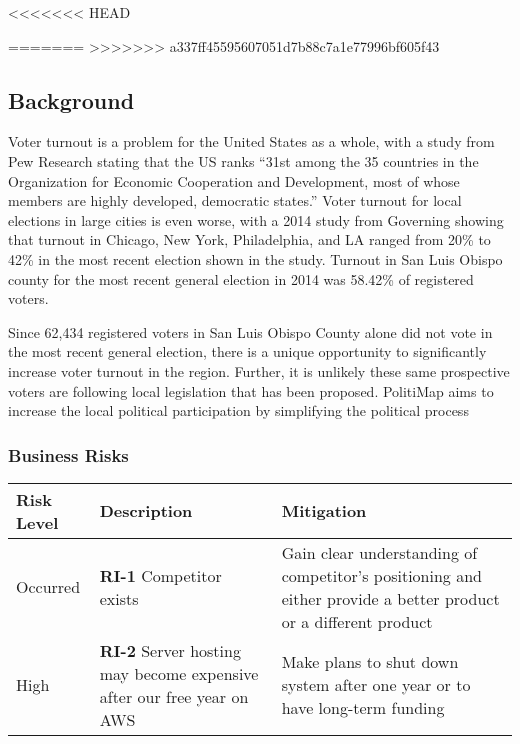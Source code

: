 % 
<<<<<<< HEAD

=======
>>>>>>> a337ff45595607051d7b88c7a1e77996bf605f43
\subsection{Background}
Voter turnout is a problem for the United States as a whole, with a
study from Pew Research stating that the US ranks “31st among the 35
countries in the Organization for Economic Cooperation and
Development, most of whose members are highly developed, democratic
states.”  \cite{pew} Voter turnout for local elections in large cities
is even worse, with a 2014 study from Governing showing that turnout
in Chicago, New York, Philadelphia, and LA ranged from 20\% to 42\% in
the most recent election shown in the study. \cite{governing} Turnout
in San Luis Obispo county for the most recent general election in 2014
was 58.42\% of registered voters. \cite{slocounty}

Since 62,434 registered voters in San Luis Obispo County alone did not vote in the most recent
general election, there is a unique opportunity to significantly increase
voter turnout in the region. Further, it is unlikely these same prospective voters are following local legislation that has been proposed. PolitiMap aims to increase the local political participation by simplifying the political process

\subsubsection{Business Risks}
\begin{tabu}{lXX}
  \toprule
  Risk Level & Description & Mitigation \\
  \midrule
  Occurred &
  \textbf{RI-1} Competitor exists &
  Gain clear
  understanding of competitor's positioning and either provide a
  better product or a different product\\

  High &
  \textbf{RI-2} Server hosting may become expensive after our
  free year on AWS &
  Make plans to shut down system after one year or to
  have long-term funding \\
  \bottomrule
\end{tabu}

